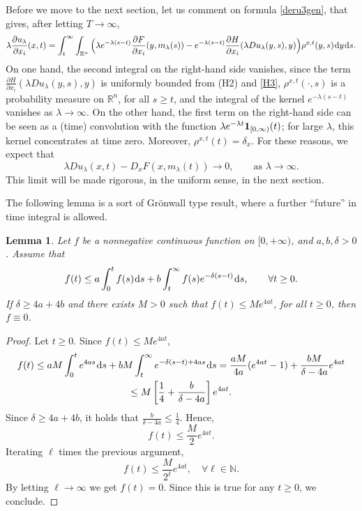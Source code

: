 \documentclass{amsart}
\newtheorem{lemma}[thm]{Lemma}
\theoremstyle{remark}
\theoremstyle{definition}
\theoremstyle{Claim}
\newcommand{\R}{\mathbb{R}}
\newcommand{\dd}{\hspace{0.7pt}{\rm d}}
\theoremstyle{plain}
\begin{document}
	Before we move to the next section, let us comment on formula \eqref{deru3gen}, that gives, after letting $T \to \infty$,
	\[
		\displaystyle{\lambda \frac{\partial u_\lambda}{\partial x_i} (x,t)  = \int_{t}^{\infty}  \int_{\R^n} \Big(\lambda e^{-\lambda (s-t)} \frac{\partial F}{\partial x_i} (y,m_\lambda(s)) - e^{-\lambda (s-t)}\frac{\partial H}{\partial x_i}} (\lambda Du_\lambda(y,s),y) \Big) \rho^{x, t}(y,s) \dd y \dd s.
	\]
	On one hand, the second integral on the right-hand side vanishes, since the term $\frac{\partial H}{\partial x_i} (\lambda Du_\lambda(y,s),y) $ is uniformly bounded from (H2) and \eqref{H3}, $\rho^{x,t}(\cdot,s)$ is a probability measure on $\mathbb{R}^n$, for all $s\geq t$, and the integral of the kernel $e^{-\lambda (s-t)}$ vanishes as $\lambda \to \infty$. On the other hand, the first term on the right-hand side can be seen as a (time) convolution with the function $\lambda e^{-\lambda t}{\bf 1}_{[0,\infty)}(t)$; for large $\lambda$, this kernel concentrates at time zero. Moreover, $\rho^{x,t}(t)=\delta_{x}$. For these reasons, we expect that
		\[
		\lambda D u_\lambda(x,t) - D_xF(x,m_\lambda(t))\to 0, \qquad \text{as $\lambda \to \infty$}.
		\]
	This limit will be made rigorous, in the uniform sense, in the next section.
	
	\medskip

	The following lemma is a sort of Gr\"onwall type result, where a further ``future'' in time integral is allowed.
	
	\begin{lemma}\label{groplus} Let $f$ be a nonnegative continuous function on $[0,+\infty)$, and $a, b, \delta > 0$. Assume that
	\[
	f(t) \le a \int_0^t f(s) \dd s + b\int_t^{\infty} f(s) e^{-\delta(s-t)}\dd s, \qquad \forall t \geq 0.
	\]
	If $\delta \ge 4a+4b$ and there exists $M>0$ such that $f(t) \le Me^{4a t}$, for all $t\geq 0$, then $f \equiv 0$.
	\end{lemma}
	
	\begin{proof} Let $t\geq 0$. Since $f(t) \le Me^{4a t}$,
	\begin{multline*}
	f(t) \le a M \int_0^t e^{4a s} \dd s + b M \int_t^{\infty} e^{-\delta(s-t)+4a s} \dd s = \frac{aM}{4a}(e^{4a t} - 1) + \frac{bM}{\delta-4a} e^{4a t} \\ \le
	M\left[\frac{1}{4} +  \frac{b}{\delta-4a} \right]e^{4a t}.
	\end{multline*}
	Since $\delta \ge 4a+4b$, it holds that $\frac{b}{\delta-4a} \le \frac14$. Hence,
	\[
	f(t) \le \frac M2 e^{ 4a t}.
	\]
	Iterating $\ell$ times the previous argument,
	\[
	f(t) \le \frac M{2^\ell} e^{4a t}, \quad \forall \ell\in \mathbb{N}.
	\]
	By letting $\ell \to \infty$ we get $f(t)=0$. Since this is true for any $t\geq 0$, we conclude.
	\end{proof}
	
\end{document}
